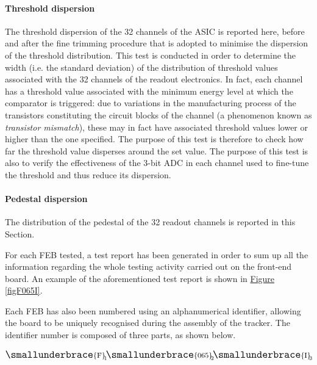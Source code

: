 \paragraph{Threshold dispersion} The threshold dispersion of the 32 channels of the ASIC is reported here, before and after the fine trimming procedure that is adopted to minimise the dispersion of the threshold distribution. This test is conducted in order to determine the width (i.e. the standard deviation) of the distribution of threshold values associated with the 32 channels of the readout electronics. In fact, each channel has a threshold value associated with the minimum energy level at which the comparator is triggered: due to variations in the manufacturing process of the transistors constituting the circuit blocks of the channel (a phenomenon known as \textit{transistor mismatch}), these may in fact have associated threshold values lower or higher than the one specified. The purpose of this test is therefore to check how far the threshold value disperses around the set value. The purpose of this test is also to verify the effectiveness of the 3-bit ADC in each channel used to fine-tune the threshold and thus reduce its dispersion.

\paragraph{Pedestal dispersion} The distribution of the pedestal of the 32 readout channels is reported in this Section.\\

\par
For each FEB tested, a test report has been generated in order to sum up all the information regarding the whole testing activity carried out on the front-end board. An example of the aforementioned test report is shown in \hyperref[figF065I]{Figure \ref{figF065I}}. 

\par
Each FEB has also been numbered using an alphanumerical identifier, allowing the board to be uniquely recognised during the assembly of the tracker. The identifier number is composed of three parts, as shown below.

\begin{gather*}
    \Large
    \smallunderbrace{\mathrm{F}}_{\text{\clap{1}}} 
    \smallunderbrace{\mathrm{065}}_{\text{\clap{2}}}
    \smallunderbrace{\mathrm{I}}_{\text{\clap{3}}}
\end{gather*}

